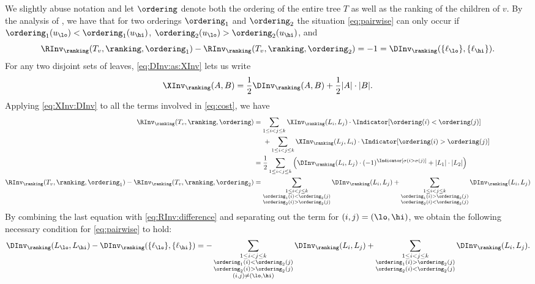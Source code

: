 \documentclass{toc}
\begin{document}
We slightly abuse notation and  let $\ordering$ denote both the ordering of the entire tree $T$ as well as the ranking of the children of $v$. By the analysis of , we have that for two orderings $\ordering_1$ and $\ordering_2$ the situation \eqref{eq:pairwise} can only occur if $\ordering_1(u_\lo) < \ordering_1(u_\hi)$, $\ordering_2(u_\lo) > \ordering_2(u_\hi)$, and 
\begin{equation}\label{eq:RInv:difference}
\RInv_\ranking(T_v,\ranking,\ordering_1) -
\RInv_\ranking(T_v,\ranking,\ordering_2) = -1 = \DInv_\ranking(\{\ell_\lo\},\{\ell_\hi\}).
\end{equation}
For any two disjoint sets of leaves, \eqref{eq:DInv:as:XInv} lets us write 
\begin{equation}\label{eq:XInv:DInv}
\XInv_\ranking(A,B) =  \frac{1}{2} \DInv_\ranking(A,B) + \frac{1}{2} |A| \cdot |B|.
\end{equation}
Applying \eqref{eq:XInv:DInv} to all the terms involved in \eqref{eq:cost}, we have
\begin{align*}
\RInv_\ranking(T_v,\ranking,\ordering) 
& = \sum_{1 \le i < j \le k} \XInv_\ranking(L_i,L_j) \cdot \Indicator[\ordering(i) < \ordering(j)] \\
& \;\;\;\;\; + \sum_{1 \le i < j \le k} \XInv_\ranking(L_j,L_i) \cdot \Indicator[\ordering(i) > \ordering(j)] \\
& = \frac{1}{2} \sum_{1 \le i < j \le k} \left( \DInv_\ranking(L_i,L_j) \cdot (-1)^{\Indicator[\sigma(i > \sigma(j)]} + |L_1| \cdot |L_2| \right) \\
\RInv_\ranking(T_v,\ranking,\ordering_1) -
\RInv_\ranking(T_v,\ranking,\ordering_2)
& = 
\sum\limits_{\substack{1 \le i < j \le k \\ \ordering_1(i) < \ordering_2(j) \\ \ordering_2(i) > \ordering_2(j)}}\DInv_\ranking(L_i,L_j)
+ \sum\limits_{\substack{1 \le i < j \le k \\ \ordering_1(i) > \ordering_2(j) \\ \ordering_2(i) < \ordering_2(j)}} \DInv_\ranking(L_i,L_j)
\end{align*}
By combining the last equation with \eqref{eq:RInv:difference} and separating out the term for $(i,j)=(\lo,\hi)$, we obtain the following necessary condition for \eqref{eq:pairwise} to hold:
\begin{equation}\label{eq:necessary}
\DInv_\ranking(L_\lo,L_\hi) - \DInv_\ranking(\{\ell_\lo\},\{\ell_\hi\})
= -\sum\limits_{\substack{1 \le i < j \le k \\ \ordering_1(i) < \ordering_2(j) \\ \ordering_2(i) > \ordering_2(j) \\ (i,j) \ne (\lo,\hi)}} \DInv_\ranking(L_i,L_j)
+ \sum\limits_{\substack{1 \le i < j \le k \\ \ordering_1(i) > \ordering_2(j) \\ \ordering_2(i) < \ordering_2(j)}} \DInv_\ranking(L_i,L_j).
\end{equation} 
\end{document}
